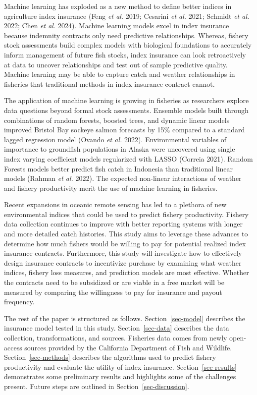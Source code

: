 \documentclass[
  letterpaper,
  DIV=11,
  numbers=noendperiod]{scrartcl}
\begin{document}
Machine learning has exploded as a new method to define better indices
in agriculture index insurance (Feng \emph{et al.} 2019; Cesarini
\emph{et al.} 2021; Schmidt \emph{et al.} 2022; Chen \emph{et al.}
2024). Machine learning models excel in index insurance because
indemnity contracts only need predictive relationships. Whereas, fishery
stock assessments build complex models with biological foundations to
accurately inform management of future fish stocks, index insurance can
look retroactively at data to uncover relationships and test out of
sample predictive quality. Machine learning may be able to capture catch
and weather relationships in fisheries that traditional methods in index
insurance contract cannot.

The application of machine learning is growing in fisheries as
researchers explore data questions beyond formal stock assessments.
Ensemble models built through combinations of random forests, boosted
trees, and dynamic linear models improved Bristol Bay sockeye salmon
forecasts by 15\% compared to a standard lagged regression model (Ovando
\emph{et al.} 2022). Environmental variables of importance to groundfish
populations in Alaska were uncovered using single index varying
coefficient models regularized with LASSO (Correia 2021). Random Forests
models better predict fish catch in Indonesia than traditional linear
models (Rahman \emph{et al.} 2022). The expected non-linear interactions
of weather and fishery productivity merit the use of machine learning in
fisheries.

Recent expansions in oceanic remote sensing has led to a plethora of new
environmental indices that could be used to predict fishery
productivity. Fishery data collection continues to improve with better
reporting systems with longer and more detailed catch histories. This
study aims to leverage these advances to determine how much fishers
would be willing to pay for potential realized index insurance
contracts. Furthermore, this study will investigate how to effectively
design insurance contracts to incentivize purchase by examining what
weather indices, fishery loss measures, and prediction models are most
effective. Whether the contracts need to be subsidized or are viable in
a free market will be measured by comparing the willingness to pay for
insurance and payout frequency.

The rest of the paper is structured as follows. Section~\ref{sec-model}
describes the insurance model tested in this study.
Section~\ref{sec-data} describes the data collection, transformations,
and sources. Fisheries data comes from newly open-access sources
provided by the California Department of Fish and Wildlife.
Section~\ref{sec-methods} describes the algorithms used to predict
fishery productivity and evaluate the utility of index insurance.
Section~\ref{sec-results} demonstrates some preliminary results and
highlights some of the challenges present. Future steps are outlined in
Section~\ref{sec-discussion}.
\end{document}
